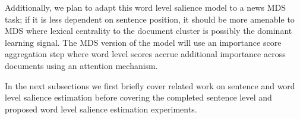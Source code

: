 Additionally, we plan to adapt this word level salience model to a news MDS task;
if it is less dependent on sentence position, it should be more amenable 
to MDS where lexical centrality to the document cluster is possibly
the dominant learning signal.  
The MDS version of the model will use an importance score aggregation step
where word level scores accrue additional importance across documents 
using an attention mechanism.


In the next subsections we first briefly cover related work on sentence
and word level salience estimation before covering the 
completed sentence level
and proposed word level salience estimation experiments.














